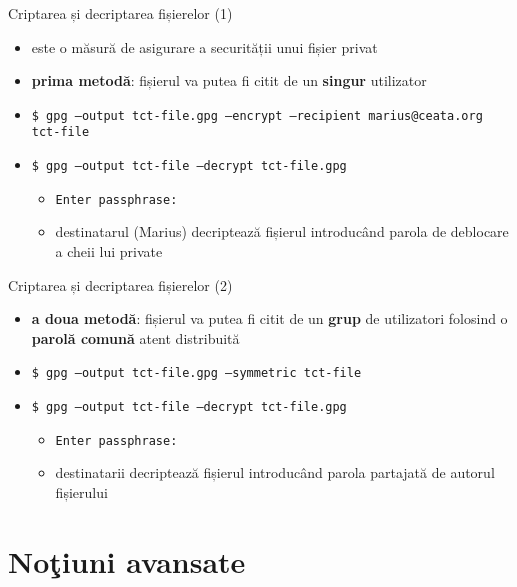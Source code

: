 \documentclass{beamer}
\begin{document}
\begin{frame}{Criptarea și decriptarea fișierelor (1)}
  \begin{itemize}
    \item este o măsură de asigurare a securității unui fișier privat
    \item \textbf{prima metodă}: fișierul va putea fi citit de un
    \textbf{singur} utilizator
    \item \texttt{\$ gpg --output tct-file.gpg --encrypt --recipient
    marius@ceata.org tct-file}
    \item \texttt{\$ gpg --output tct-file --decrypt tct-file.gpg}
    \begin{itemize}
      \item \texttt{Enter passphrase: }
      \item destinatarul (Marius) decriptează fișierul introducând parola de
      deblocare a cheii lui private
    \end{itemize}
  \end{itemize}
\end{frame}

\begin{frame}{Criptarea și decriptarea fișierelor (2)}
  \begin{itemize}
    \item \textbf{a doua metodă}: fișierul va putea fi citit de un
    \textbf{grup} de utilizatori folosind o \textbf{parolă comună} atent
    distribuită
    \item \texttt{\$ gpg --output tct-file.gpg --symmetric tct-file}
    \item \texttt{\$ gpg --output tct-file --decrypt tct-file.gpg}
    \begin{itemize}
      \item \texttt{Enter passphrase: }
      \item destinatarii decriptează fișierul introducând parola 
      partajată de autorul fișierului
    \end{itemize}
  \end{itemize}
\end{frame}

\section{No\c{t}iuni avansate}
\frame{\tableofcontents[currentsection]}
\end{document}
